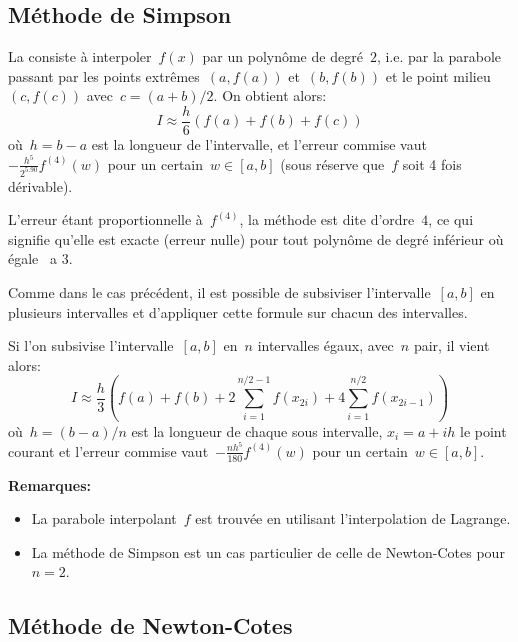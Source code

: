 \medskip
\subsection*{Méthode de Simpson}

La  consiste à interpoler~$f(x)$ par un polynôme 
de degré~$2$, i.e. par la parabole passant par les points extrêmes~$(a,f(a))$ et~$(b,f(b))$ 
et le point milieu~$(c,f(c))$ avec~$c=(a+b)/2$.
On obtient alors:
\begin{equation} I\approx \frac{h}{6} \left( f(a)+f(b)+f(c)\right)\end{equation}
où~$h=b-a$ est la longueur de l'intervalle,
et l'erreur commise vaut~$-\frac{h^5}{2^5.90} f^{(4)}(w)$ pour un certain~$w\in[a,b]$
(sous réserve que~$f$ soit 4 fois dérivable).

L'erreur étant proportionnelle à~$f^{(4)}$, la méthode est dite d'ordre~$4$, ce qui
signifie qu'elle est exacte (erreur nulle) pour tout polynôme de degré inférieur
où égale \ a 3.

\medskip
Comme dans le cas préc\'edent, il est possible de subsiviser l'intervalle~$[a,b]$ en plusieurs intervalles 
et d'appliquer cette formule sur chacun des intervalles.

Si l'on subsivise l'intervalle~$[a,b]$ en~$n$ intervalles égaux, avec~$n$ pair, il vient alors:
\begin{equation} I\approx \frac{h}{3} \left( f(a)+f(b)+2\sum_{i=1}^{n/2-1}f(x_{2i})+4\sum_{i=1}^{n/2}f(x_{2i-1})
\right)\end{equation}
où~$h=(b-a)/n$ est la longueur de chaque sous intervalle, $x_i=a+ih$ le
point courant et l'erreur commise vaut~$-\frac{nh^5}{180} f^{(4)}(w)$ pour un certain~$w\in[a,b]$.

\medskip
\textbf{Remarques:}
\begin{itemize}
\item La parabole interpolant~$f$ est trouvée en utilisant l'interpolation de Lagrange.
\item La méthode de Simpson est un cas particulier de 
	celle de Newton-Cotes pour~$n=2$.
\end{itemize}


\medskip
\subsection*{Méthode de Newton-Cotes}

